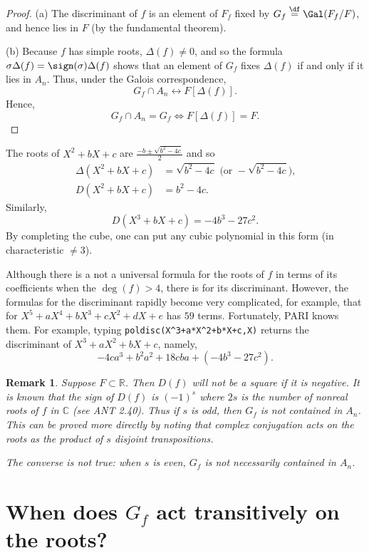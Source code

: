 \documentclass[a4paper,11pt,final,openany]{memoir}
\newtheorem{remark}[X]{Remark}
\theoremstyle{nonumberplain}
\newtheorem{proof}{Proof.}
\begin{document}
\begin{proof}
(a) The discriminant of $f$ is an element of $F_{f}$ fixed by $G_{f}%
\overset{\df}{=}\Gal(F_{f}/F)$, and hence lies in $F$ (by the
fundamental theorem).

(b) Because $f$ has simple roots, $\Delta(f)\neq0$, and so the formula
$\sigma\Delta(f)=\sign(\sigma)\Delta(f)$ shows that an element of $G_{f}$
fixes $\Delta(f)$ if and only if it lies in $A_{n}$. Thus, under the Galois
correspondence,%
\[
G_{f}\cap A_{n}\leftrightarrow F[\Delta(f)]\text{.}%
\]
Hence,%
\[
G_{f}\cap A_{n}=G_{f}\iff F[\Delta(f)]=F.
\]

\end{proof}

The roots of $X^{2}\allowbreak+bX+c$ are $\frac{-b\pm\sqrt{b^{2}-4c}}{2}$ and
so%
\begin{align*}
\Delta(X^{2}\allowbreak+bX+c)  &  =\sqrt{b^{2}-4c}\text{ (or }-\sqrt{b^{2}%
-4c}\text{),}\\
D(X^{2}\allowbreak+bX+c)  &  =b^{2}-4c.
\end{align*}
Similarly, \qquad%
\[
D(X^{3}+bX+c)=-4b^{3}-27c^{2}.
\]
By completing the cube, one can put any cubic polynomial in this form (in
characteristic $\neq3$).

Although there is a not a universal formula for the roots of $f$ in terms of
its coefficients when the $\deg(f)>4$, there is for its discriminant. However,
the formulas for the discriminant rapidly become very complicated, for
example, that for $X^{5}+aX^{4}+bX^{3}+cX^{2}+dX+e$ has $59$ terms.
Fortunately, PARI%
knows them. For example, typing \verb|poldisc(X^3+a*X^2+b*X+c,X)| returns the
discriminant of $X^{3}+aX^{2}+bX+c$, namely,
\[
-4ca^{3}+b^{2}a^{2}+18cba+(-4b^{3}-27c^{2}).
\]


\begin{remark}
\label{cg3}Suppose $F\subset\mathbb{R}$. Then $D(f)$ will not be a square if
it is negative. It is known that the sign of $D(f)$ is $(-1)^{s}$ where $2s$
is the number of nonreal roots of $f$ in $\mathbb{C}$ (see ANT 2.40). Thus if
$s$ is odd, then $G_{f}$ is not contained in $A_{n}$. This can be proved more
directly by noting that complex conjugation acts on the roots as the product
of $s$ disjoint transpositions.

The converse is not true: when $s$ is even, $G_{f}$ is not necessarily
contained in $A_{n}$.
\end{remark}

\section{When does \texorpdfstring{$G_{f}$}{Gf} act transitively on the
roots?}
\end{document}
